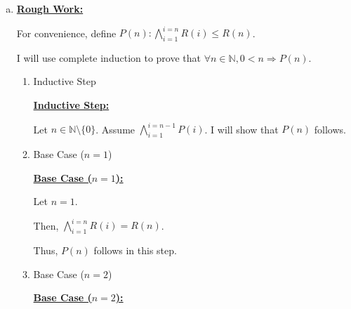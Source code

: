 \documentclass[12pt]{article}
\begin{document}
\begin{enumerate}[a.]

    \item

    \bigskip

    \begin{mdframed}
        \underline{\textbf{Rough Work:}}

        \bigskip

        For convenience, define $P(n): \bigwedge\limits_{i=1}^{i=n} R(i) \leq R(n)$.

        \bigskip

        I will use complete induction to prove that $\forall n \in \mathbb{N},
        0 < n \Rightarrow P(n)$.

        \bigskip

        \begin{enumerate}[1.]
            \item Inductive Step

            \begin{mdframed}
            \underline{\textbf{Inductive Step:}}

            \bigskip

            Let $n \in \mathbb{N} \setminus \{0\}$. Assume $\bigwedge\limits_{i=1}^{i=n-1} P(i)$.
            I will show that $P(n)$ follows.
            \end{mdframed}

            \item Base Case ($n = 1$)

            \begin{mdframed}
            \underline{\textbf{Base Case ($n = 1$):}}

            \bigskip

            Let $n = 1$.

            \bigskip

            Then, $\bigwedge\limits_{i=1}^{i=n} R(i) = R(n)$.

            \bigskip

            Thus, $P(n)$ follows in this step.

            \end{mdframed}

            \item Base Case ($n = 2$)

            \begin{mdframed}
            \underline{\textbf{Base Case ($n = 2$):}}


\end{mdframed}
\end{enumerate}
\end{mdframed}
\end{enumerate}
\end{document}
